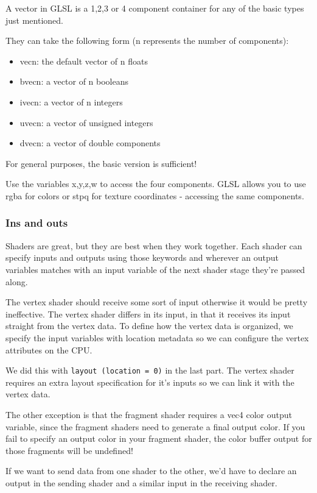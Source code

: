 \documentclass{article}
\begin{document}
A vector in GLSL is a 1,2,3 or 4 component container for any of the basic types just mentioned. 

They can take the following form (n represents the number of components):

\begin{itemize}
    \item vecn: the default vector of n floats
    \item bvecn: a vector of n booleans
    \item ivecn: a vector of n integers
    \item uvecn: a vector of unsigned integers
    \item dvecn: a vector of double components
\end{itemize}

For general purposes, the basic version is sufficient!

Use the variables x,y,z,w to access the four components. GLSL allows you to use rgba for colors or stpq for texture coordinates - accessing the same components. 

\subsubsection{Ins and outs}

Shaders are great, but they are best when they work together. Each shader can specify inputs and outputs using those keywords and wherever an output variables matches with an input variable of the next shader stage they're passed along. 

The vertex shader should receive some sort of input otherwise it would be pretty ineffective. The vertex shader differs in its input, in that it receives its input straight from the vertex data. To define how the vertex data is organized, we specify the input variables with location metadata so we can configure the vertex attributes on the CPU. 

We did this with \texttt{layout (location = 0)} in the last part. The vertex shader requires an extra layout specification for it's inputs so we can link it with the vertex data. 

The other exception is that the fragment shader requires a vec4 color output variable, since the fragment shaders need to generate a final output color. If you fail to specify an output color in your fragment shader, the color buffer output for those fragments will be undefined!

If we want to send data from one shader to the other, we'd have to declare an output in the sending shader and a similar input in the receiving shader. 
\end{document}
